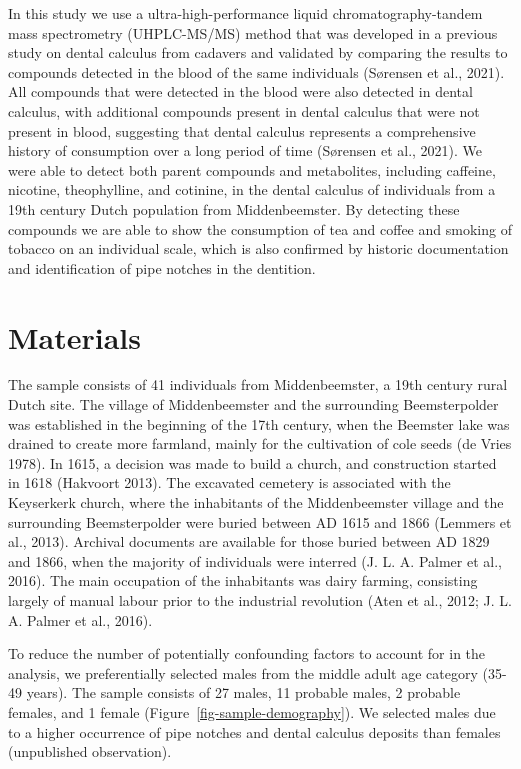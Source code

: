 \documentclass[
  letterpaper,
]{book}
\begin{document}
In this study we use a ultra-high-performance liquid
chromatography-tandem mass spectrometry (UHPLC-MS/MS) method that was
developed in a previous study on dental calculus from cadavers and
validated by comparing the results to compounds detected in the blood of
the same individuals (Sørensen et al., 2021). All compounds that were
detected in the blood were also detected in dental calculus, with
additional compounds present in dental calculus that were not present in
blood, suggesting that dental calculus represents a comprehensive
history of consumption over a long period of time (Sørensen et al.,
2021). We were able to detect both parent compounds and metabolites,
including caffeine, nicotine, theophylline, and cotinine, in the dental
calculus of individuals from a 19th century Dutch population from
Middenbeemster. By detecting these compounds we are able to show the
consumption of tea and coffee and smoking of tobacco on an individual
scale, which is also confirmed by historic documentation and
identification of pipe notches in the dentition.

\hypertarget{mb11CalculusPilot-mat}{%
\section{Materials}\label{mb11CalculusPilot-mat}}

The sample consists of 41 individuals from Middenbeemster, a 19th
century rural Dutch site. The village of Middenbeemster and the
surrounding Beemsterpolder was established in the beginning of the 17th
century, when the Beemster lake was drained to create more farmland,
mainly for the cultivation of cole seeds (de Vries 1978). In 1615, a
decision was made to build a church, and construction started in 1618
(Hakvoort 2013). The excavated cemetery is associated with the
Keyserkerk church, where the inhabitants of the Middenbeemster village
and the surrounding Beemsterpolder were buried between AD 1615 and 1866
(Lemmers et al., 2013). Archival documents are available for those
buried between AD 1829 and 1866, when the majority of individuals were
interred (J. L. A. Palmer et al., 2016). The main occupation of the
inhabitants was dairy farming, consisting largely of manual labour prior
to the industrial revolution (Aten et al., 2012; J. L. A. Palmer et al.,
2016).

To reduce the number of potentially confounding factors to account for
in the analysis, we preferentially selected males from the middle adult
age category (35-49 years). The sample consists of 27 males, 11 probable
males, 2 probable females, and 1 female
(Figure~\ref{fig-sample-demography}). We selected males due to a higher
occurrence of pipe notches and dental calculus deposits than females
(unpublished observation).
\end{document}
